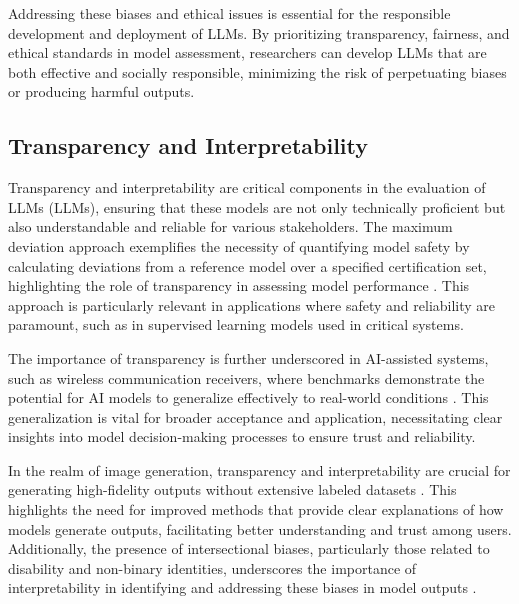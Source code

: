 Addressing these biases and ethical issues is essential for the responsible development and deployment of LLMs. By prioritizing transparency, fairness, and ethical standards in model assessment, researchers can develop LLMs that are both effective and socially responsible, minimizing the risk of perpetuating biases or producing harmful outputs.



\subsection{Transparency and Interpretability} \label{subsec:Transparency and Interpretability}



Transparency and interpretability are critical components in the evaluation of LLMs (LLMs), ensuring that these models are not only technically proficient but also understandable and reliable for various stakeholders. The maximum deviation approach exemplifies the necessity of quantifying model safety by calculating deviations from a reference model over a specified certification set, highlighting the role of transparency in assessing model performance \cite{wei2022safetyinterpretablemachinelearning}. This approach is particularly relevant in applications where safety and reliability are paramount, such as in supervised learning models used in critical systems.



The importance of transparency is further underscored in AI-assisted systems, such as wireless communication receivers, where benchmarks demonstrate the potential for AI models to generalize effectively to real-world conditions \cite{luostari2024adaptingrealityovertheairvalidation}. This generalization is vital for broader acceptance and application, necessitating clear insights into model decision-making processes to ensure trust and reliability.



In the realm of image generation, transparency and interpretability are crucial for generating high-fidelity outputs without extensive labeled datasets \cite{ramesh2021zero}. This highlights the need for improved methods that provide clear explanations of how models generate outputs, facilitating better understanding and trust among users. Additionally, the presence of intersectional biases, particularly those related to disability and non-binary identities, underscores the importance of interpretability in identifying and addressing these biases in model outputs \cite{magee2021intersectionalbiascausallanguage}.



